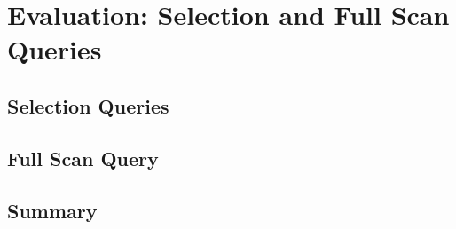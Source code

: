 {\chapter{Evaluation: Selection and Full Scan Queries}
\label{chap:Eval_5}


\section{Selection Queries}


\section{Full Scan Query}


\section{Summary}
}